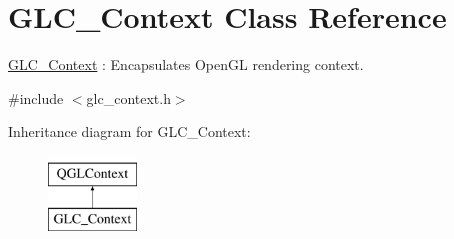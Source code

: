\hypertarget{class_g_l_c___context}{\section{G\-L\-C\-\_\-\-Context Class Reference}
\label{class_g_l_c___context}
}


\hyperlink{class_g_l_c___context}{G\-L\-C\-\_\-\-Context} \-: Encapsulates Open\-G\-L rendering context.  




{\ttfamily \#include $<$glc\-\_\-context.\-h$>$}

Inheritance diagram for G\-L\-C\-\_\-\-Context\-:\begin{figure}[H]
\begin{center}
\leavevmode
\includegraphics[height=2.000000cm]{class_g_l_c___context}
\end{center}
\end{figure}
